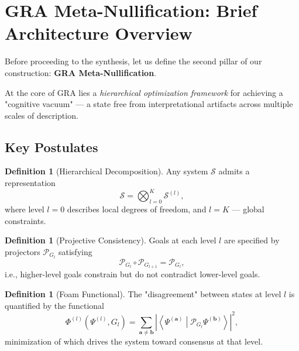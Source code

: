 \documentclass[12pt,a4paper]{article}
\theoremstyle{plain}
\theoremstyle{definition}
\newtheorem{definition}[theorem]{Definition}
\theoremstyle{remark}
\newcommand{\cP}{\mathcal{P}}
\newcommand{\cS}{\mathcal{S}}
\newcommand{\abs}[1]{\left|#1\right|}
\newcommand{\inner}[2]{\left\langle #1 \middle| #2 \right\rangle}
\begin{document}
\section{GRA Meta-Nullification: Brief Architecture Overview}
\label{sec:gra-primer}

Before proceeding to the synthesis, let us define the second pillar of our construction: \textbf{GRA Meta-Nullification}.

At the core of GRA lies a \emph{hierarchical optimization framework} for achieving a "cognitive vacuum" --- a state free from interpretational artifacts across multiple scales of description.

\subsection{Key Postulates}

\begin{definition}[Hierarchical Decomposition]
Any system $\cS$ admits a representation
\begin{equation}
    \cS = \bigotimes_{l=0}^{K} \cS^{(l)},
    \label{eq:hier-decomp}
\end{equation}
where level $l=0$ describes local degrees of freedom, and $l=K$ --- global constraints.
\end{definition}

\begin{definition}[Projective Consistency]
Goals at each level $l$ are specified by projectors $\cP_{G_l}$ satisfying
\begin{equation}
    \cP_{G_l} \circ \cP_{G_{l+1}} = \cP_{G_l},
    \label{eq:proj-consistency}
\end{equation}
i.e., higher-level goals constrain but do not contradict lower-level goals.
\end{definition}

\begin{definition}[Foam Functional]
The "disagreement" between states at level $l$ is quantified by the functional
\begin{equation}
    \Phi^{(l)}(\Psi^{(l)}, G_l) = \sum_{\mathbf{a} \neq \mathbf{b}} 
    \abs{\inner{\Psi^{(\mathbf{a})}}{\cP_{G_l} \Psi^{(\mathbf{b})}}}^2,
    \label{eq:foam-functional}
\end{equation}
minimization of which drives the system toward consensus at that level.
\end{definition}
\end{document}
